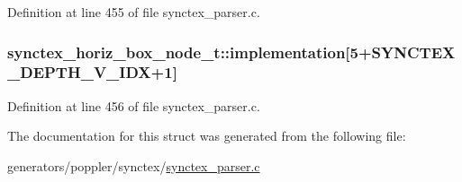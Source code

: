 Definition at line 455 of file synctex\+\_\+parser.\+c.

\hypertarget{structsynctex__horiz__box__node__t_a085cd606e3075bd170e59e33b48c506d}{
\subsubsection[{implementation}]{ synctex\+\_\+horiz\+\_\+box\+\_\+node\+\_\+t\+::implementation\mbox{[}5+{\bf S\+Y\+N\+C\+T\+E\+X\+\_\+\+D\+E\+P\+T\+H\+\_\+\+V\+\_\+\+I\+D\+X}+1\mbox{]}}}\label{structsynctex__horiz__box__node__t_a085cd606e3075bd170e59e33b48c506d}


Definition at line 456 of file synctex\+\_\+parser.\+c.



The documentation for this struct was generated from the following file\+:\begin{DoxyCompactItemize}
\item 
generators/poppler/synctex/\hyperlink{synctex__parser_8c}{synctex\+\_\+parser.\+c}\end{DoxyCompactItemize}
